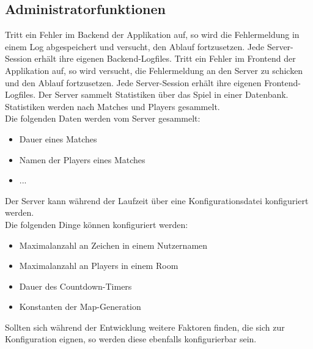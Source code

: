 \subsection{Administratorfunktionen}
\begin{description}
		Tritt ein Fehler im Backend der Applikation auf, so wird die Fehlermeldung in einem Log abgespeichert und versucht, den Ablauf fortzusetzen. Jede Server-Session erhält ihre eigenen Backend-Logfiles.
		Tritt ein Fehler im Frontend der Applikation auf, so wird versucht, die Fehlermeldung an den Server zu schicken und den Ablauf fortzusetzen. Jede Server-Session erhält ihre eigenen Frontend-Logfiles.
		Der Server sammelt Statistiken über das Spiel in einer Datenbank. Statistiken werden nach Matches und Players gesammelt. \\
		Die folgenden Daten werden vom Server gesammelt:
		\begin{itemize}
			\item Dauer eines Matches
			\item Namen der Players eines Matches
			\item ...
		\end{itemize}
		Der Server kann während der Laufzeit über eine Konfigurationsdatei konfiguriert werden. \\
		Die folgenden Dinge können konfiguriert werden:
		\begin{itemize}
			\item Maximalanzahl an Zeichen in einem Nutzernamen
			\item Maximalanzahl an Players in einem Room
			\item Dauer des Countdown-Timers
			\item Konstanten der Map-Generation
		\end{itemize}
		Sollten sich während der Entwicklung weitere Faktoren finden, die sich zur Konfiguration eignen, so werden diese ebenfalls konfigurierbar sein.
\end{description}